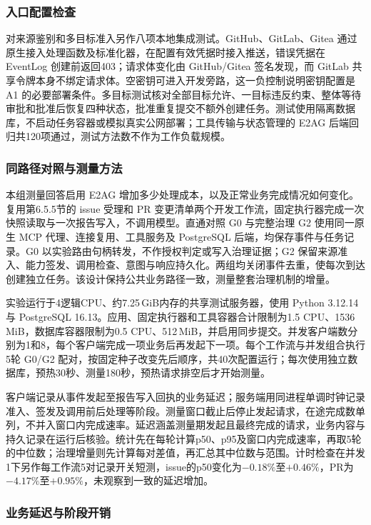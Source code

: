 \subsubsection{入口配置检查}

对来源鉴别和多目标准入另作八项本地集成测试。GitHub、GitLab、Gitea 通过原生接入处理函数及标准化器，在配置有效凭据时接入推送，错误凭据在 EventLog 创建前返回403；请求体变化由 GitHub/Gitea 签名发现，而 GitLab 共享令牌本身不绑定请求体。空密钥可进入开发旁路，这一负控制说明密钥配置是 A1 的必要部署条件。多目标测试核对全部目标允许、一目标违反约束、整体等待审批和批准后恢复四种状态，批准重复提交不额外创建任务。测试使用隔离数据库，不启动任务容器或模拟真实公网部署；工具传输与状态管理的 E2AG 后端回归共120项通过，测试方法数不作为工作负载规模。

\subsubsection{同路径对照与测量方法}

本组测量回答启用 E2AG 增加多少处理成本，以及正常业务完成情况如何变化。复用第6.5.5节的 issue 受理和 PR 变更清单两个开发工作流，固定执行器完成一次快照读取与一次报告写入，不调用模型。直通对照 G0 与完整治理 G2 使用同一原生 MCP 代理、连接复用、工具服务及 PostgreSQL 后端，均保存事件与任务记录。G0 以实验路由句柄转发，不作授权判定或写入治理证据；G2 保留来源准入、能力签发、调用检查、意图与响应持久化。两组均关闭事件去重，使每次到达创建独立任务。该设计保持公共业务路径一致，测量整套治理机制的增量。

实验运行于4逻辑CPU、约7.25\,GiB内存的共享测试服务器，使用 Python 3.12.14 与 PostgreSQL 16.13。应用、固定执行器和工具容器合计限制为1.5 CPU、1536\,MiB，数据库容器限制为0.5 CPU、512\,MiB，并启用同步提交。并发客户端数分别为1和8，每个客户端完成一项业务后再发起下一项。每个工作流与并发组合执行5轮 G0/G2 配对，按固定种子改变先后顺序，共40次配置运行；每次使用独立数据库，预热30秒、测量180秒，预热请求排空后才开始测量。

客户端记录从事件发起至报告写入回执的业务延迟；服务端用同进程单调时钟记录准入、签发及调用前后处理等阶段。测量窗口截止后停止发起请求，在途完成数单列，不并入窗口内完成速率。延迟涵盖测量期发起且最终完成的请求，业务内容与持久记录在运行后核验。统计先在每轮计算p50、p95及窗口内完成速率，再取5轮的中位数；治理增量则先计算每对差值，再汇总其中位数与范围。计时检查在并发1下另作每工作流5对记录开关短测，issue的p50变化为$-0.18\%$至$+0.46\%$，PR为$-4.17\%$至$+0.95\%$，未观察到一致的延迟增加。

\subsubsection{业务延迟与阶段开销}

